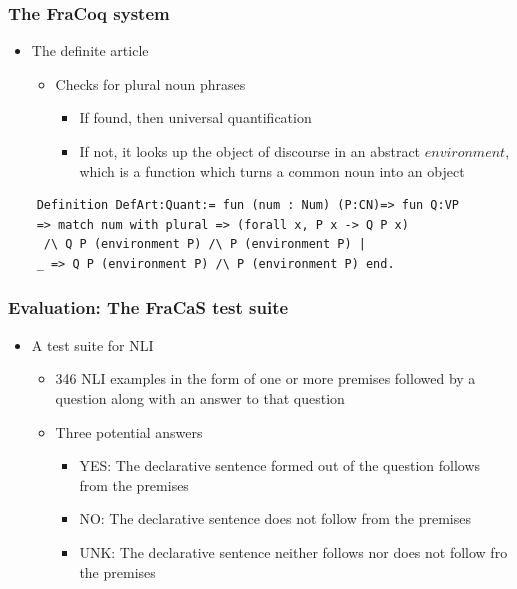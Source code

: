\documentclass[11pt]{beamer}
\begin{document}
\begin{frame}[fragile]
	\frametitle{The FraCoq system}
	
	\begin{itemize}
		
		\item The definite article
		
		
	\begin{itemize}
		
		\item Checks for plural noun phrases
		
			\begin{itemize}
				
				\item If found, then universal quantification
				
				\item If not, it
				looks up the object of discourse in an abstract $environment$, which
				is a function which turns a common noun into an object



\end{itemize}\end{itemize}\end{itemize}
\begin{verbatim}
	Definition DefArt:Quant:= fun (num : Num) (P:CN)=> fun Q:VP
	=> match num with plural => (forall x, P x -> Q P x)
	 /\ Q P (environment P) /\ P (environment P) |
	_ => Q P (environment P) /\ P (environment P) end.
\end{verbatim}



\end{frame}

\begin{frame}[fragile]
	\frametitle{Evaluation: The FraCaS test suite}
	
	\begin{itemize}
		
		\item A test suite for NLI
		
		
	\begin{itemize}
		
		\item 346 NLI examples in the form of one or more premises followed
		by a question along with an answer to that question


\item Three potential answers

\begin{itemize}
	
	\item YES: The declarative sentence formed out of the question follows from the premises
	
	\item NO: The declarative sentence does not follow from the premises
	
	\item UNK: The declarative sentence neither follows nor does not follow fro the premises
\end{itemize}\end{itemize}\end{itemize}
\end{frame}
\end{document}
